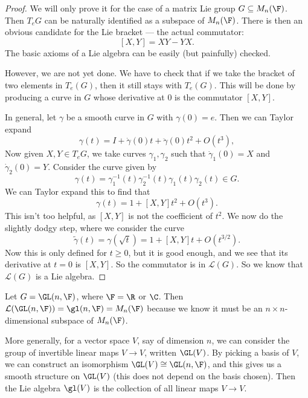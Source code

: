 \documentclass[a4paper]{article}
\begin{document}
\begin{proof}
  We will only prove it for the case of a matrix Lie group $G \subseteq M_n(\F)$. Then $T_e G$ can be naturally identified as a subspace of $M_n(\F)$. There is then an obvious candidate for the Lie bracket --- the actual commutator:
  \[
    [X, Y] = XY - YX.
  \]
  The basic axioms of a Lie algebra can be easily (but painfully) checked.

  However, we are not yet done. We have to check that if we take the bracket of two elements in $T_e(G)$, then it still stays with $T_e(G)$. This will be done by producing a curve in $G$ whose derivative at $0$ is the commutator $[X, Y]$.

  In general, let $\gamma$ be a smooth curve in $G$ with $\gamma(0) = e$. Then we can Taylor expand
  \[
    \gamma(t) = I + \dot{\gamma}(0) t + \ddot{\gamma}(0) t^2 + O(t^3),
  \]
  Now given $X, Y \in T_e G$, we take curves $\gamma_1, \gamma_2$ such that $\dot{\gamma}_1(0) = X$ and $\dot{\gamma}_2(0) = Y$. Consider the curve given by
  \[
    \gamma(t) = \gamma_1^{-1}(t) \gamma_2^{-1}(t) \gamma_1(t)\gamma_2(t) \in G.
  \]
  We can Taylor expand this to find that
  \[
    \gamma(t) = 1 + [X, Y] t^2 + O(t^3).
  \]
  This isn't too helpful, as $[X, Y]$ is not the coefficient of $t^2$. We now do the slightly dodgy step, where we consider the curve
  \[
    \tilde{\gamma}(t) = \gamma(\sqrt{t}) = 1 + [X, Y] t + O(t^{3/2}).
  \]
  Now this is only defined for $t \geq 0$, but it is good enough, and we see that its derivative at $t = 0$ is $[X, Y]$. So the commutator is in $\mathcal{L}(G)$. So we know that $\mathcal{L}(G)$ is a Lie algebra.
\end{proof}

\begin{eg}
  Let $G = \GL(n, \F)$, where $\F = \R$ or $\C$. Then $\mathcal{L}(\GL(n, \F)) = \gl(n, \F) = M_n(\F)$ because we know it must be an $n \times n$-dimensional subspace of $M_n(\F)$.

  More generally, for a vector space $V$, say of dimension $n$, we can consider the group of invertible linear maps $V \to V$, written $\GL(V)$. By picking a basis of $V$, we can construct an isomorphism $\GL(V) \cong \GL(n, \F)$, and this gives us a smooth structure on $\GL(V)$ (this does not depend on the basis chosen). Then the Lie algebra $\gl(V)$ is the collection of all linear maps $V \to V$.
\end{eg}
\end{document}
